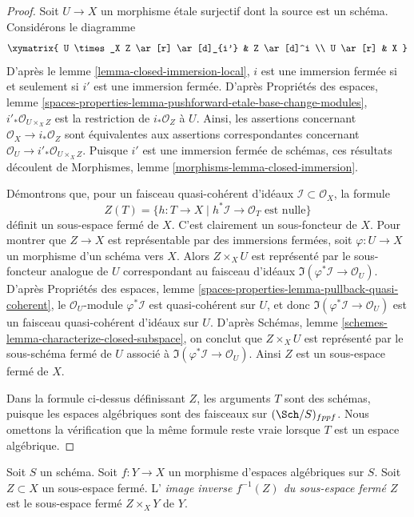 \begin{proof}
Soit $U \to X$ un morphisme \'etale surjectif dont la source est un schéma.
Considérons le diagramme
$$
\xymatrix{
U \times_X Z \ar[r] \ar[d]_{i'} & Z \ar[d]^i \\
U \ar[r] & X
}
$$
D'après le
lemme \ref{lemma-closed-immersion-local},
$i$ est une immersion fermée
si et seulement si $i'$ est une immersion fermée. D'après
Propriétés des espaces,
lemme \ref{spaces-properties-lemma-pushforward-etale-base-change-modules},
$i'_*\mathcal{O}_{U \times_X Z}$ est la restriction de
$i_*\mathcal{O}_Z$ à $U$. Ainsi, les assertions concernant
$\mathcal{O}_X \to i_*\mathcal{O}_Z$ sont équivalentes aux
assertions correspondantes concernant
$\mathcal{O}_U \to i'_*\mathcal{O}_{U \times_X Z}$.
Puisque $i'$ est une immersion fermée de schémas, ces résultats découlent de
Morphismes, lemme \ref{morphisms-lemma-closed-immersion}.

\medskip\noindent
Démontrons que, pour un faisceau quasi-cohérent
d'idéaux $\mathcal{I} \subset \mathcal{O}_X$, la formule
$$
Z(T) = \{h : T \to X \mid h^*\mathcal{I} \to \mathcal{O}_T
\text{ est nulle}\}
$$
définit un sous-espace fermé de $X$. C'est clairement un sous-foncteur de $X$.
Pour montrer que $Z \to X$ est représentable par des immersions fermées, soit
$\varphi : U \to X$ un morphisme d'un schéma vers $X$. Alors
$Z \times_X U$ est représenté par le sous-foncteur analogue de $U$ correspondant
au faisceau d'idéaux $\Im(\varphi^*\mathcal{I} \to \mathcal{O}_U)$. D'après
Propriétés des espaces,
lemme \ref{spaces-properties-lemma-pullback-quasi-coherent},
le $\mathcal{O}_U$-module $\varphi^*\mathcal{I}$ est quasi-cohérent
sur $U$, et donc $\Im(\varphi^*\mathcal{I} \to \mathcal{O}_U)$
est un faisceau quasi-cohérent d'idéaux sur $U$. D'après
Schémas, lemme \ref{schemes-lemma-characterize-closed-subspace},
on conclut que $Z \times_X U$ est représenté par le sous-schéma fermé
de $U$ associé à $\Im(\varphi^*\mathcal{I} \to \mathcal{O}_U)$.
Ainsi $Z$ est un sous-espace fermé de $X$.

\medskip\noindent
Dans la formule ci-dessus définissant $Z$, les arguments $T$ sont des schémas, puisque les espaces
algébriques sont des faisceaux sur $(\Sch/S)_{fppf}$. Nous omettons la vérification
que la même formule reste vraie lorsque $T$ est un espace algébrique.
\end{proof}

\begin{definition}
\label{definition-inverse-image-closed-subspace}
Soit $S$ un schéma. Soit $f : Y \to X$ un morphisme d'espaces algébriques
sur $S$. Soit $Z \subset X$ un sous-espace fermé. L'
{\it image inverse $f^{-1}(Z)$ du sous-espace fermé $Z$}
est le sous-espace fermé $Z \times_X Y$ de $Y$.
\end{definition}

